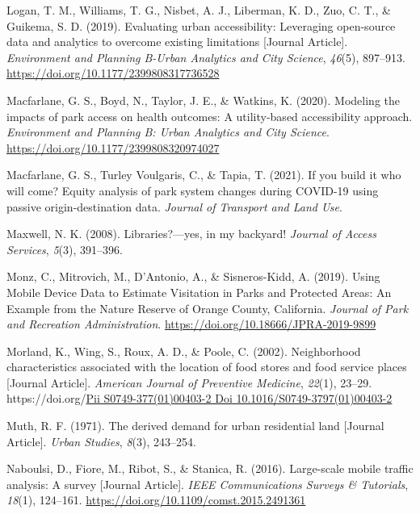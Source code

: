 \documentclass[review, 3p]{elsarticle} %
\newlength{\cslhangindent}
\newlength{\cslentryspacingunit} %
\newenvironment{CSLReferences}[2] %
 {%
  \setlength{\parindent}{0pt}
  \ifodd #1
  \let\oldpar\par
  \def\par{\hangindent=\cslhangindent\oldpar}
  \fi
  \setlength{\parskip}{#2\cslentryspacingunit}
 }%
 {}
\begin{document}
\begin{CSLReferences}{1}{0}
\leavevmode{}%
Logan, T. M., Williams, T. G., Nisbet, A. J., Liberman, K. D., Zuo, C. T., \& Guikema, S. D. (2019). Evaluating urban accessibility: Leveraging open-source data and analytics to overcome existing limitations {[}Journal Article{]}. \emph{Environment and Planning B-Urban Analytics and City Science}, \emph{46}(5), 897--913. \url{https://doi.org/10.1177/2399808317736528}

\leavevmode{}%
Macfarlane, G. S., Boyd, N., Taylor, J. E., \& Watkins, K. (2020). Modeling the impacts of park access on health outcomes: A utility-based accessibility approach. \emph{Environment and Planning B: Urban Analytics and City Science}. \url{https://doi.org/10.1177/2399808320974027}

\leavevmode{}%
Macfarlane, G. S., Turley Voulgaris, C., \& Tapia, T. (2021). If you build it who will come? Equity analysis of park system changes during COVID-19 using passive origin-destination data. \emph{Journal of Transport and Land Use}.

\leavevmode{}%
Maxwell, N. K. (2008). Libraries?---yes, in my backyard! \emph{Journal of Access Services}, \emph{5}(3), 391--396.

\leavevmode{}%
Monz, C., Mitrovich, M., D'Antonio, A., \& Sisneros-Kidd, A. (2019). {Using Mobile Device Data to Estimate Visitation in Parks and Protected Areas: An Example from the Nature Reserve of Orange County, California}. \emph{Journal of Park and Recreation Administration}. \url{https://doi.org/10.18666/JPRA-2019-9899}

\leavevmode{}%
Morland, K., Wing, S., Roux, A. D., \& Poole, C. (2002). Neighborhood characteristics associated with the location of food stores and food service places {[}Journal Article{]}. \emph{American Journal of Preventive Medicine}, \emph{22}(1), 23--29. https://doi.org/\href{https://doi.org/Pii\%20S0749-377(01)00403-2\%0ADoi\%2010.1016/S0749-3797(01)00403-2}{Pii S0749-377(01)00403-2
Doi 10.1016/S0749-3797(01)00403-2}

\leavevmode{}%
Muth, R. F. (1971). The derived demand for urban residential land {[}Journal Article{]}. \emph{Urban Studies}, \emph{8}(3), 243--254.

\leavevmode{}%
Naboulsi, D., Fiore, M., Ribot, S., \& Stanica, R. (2016). Large-scale mobile traffic analysis: A survey {[}Journal Article{]}. \emph{IEEE Communications Surveys \& Tutorials}, \emph{18}(1), 124--161. \url{https://doi.org/10.1109/comst.2015.2491361}


\end{CSLReferences}
\end{document}
